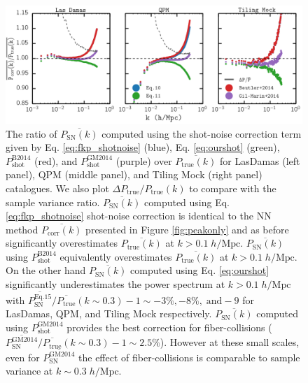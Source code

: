 \documentclass{emulateapj}
\begin{document}
\begin{figure}
\begin{center}
\includegraphics[scale=0.55]{fcpaper_pk_shotnoiseonly_comp.png}
\caption{The ratio of $\overline{P_\mathrm{SN}(k)}$ computed using the shot-noise correction term given by Eq. \ref{eq:fkp_shotnoise} (blue), Eq. \ref{eq:ourshot} (green), $P^\mathrm{B2014}_\mathrm{shot}$ (red), and $P^{\mathrm{GM2014}}_\mathrm{shot}$ (purple) over $\overline{P_\mathrm{true}(k)}$ for LasDamas (left panel), QPM (middle panel), and Tiling Mock (right panel) catalogues. We also plot $\Delta P_\mathrm{true}/P_\mathrm{true}(k)$ to compare with the sample variance ratio. $\overline{P_\mathrm{SN}(k)}$ computed using Eq. \ref{eq:fkp_shotnoise} shot-noise correction is identical to the NN method $\overline{P_\mathrm{corr}(k)}$ presented in Figure \ref{fig:peakonly} and as before significantly overestimates $\overline{P_\mathrm{true}(k)}$ at $k > 0.1 \; h/\mathrm{Mpc}$. $\overline{P_\mathrm{SN}(k)}$ using $P^\mathrm{B2014}_\mathrm{shot}$ equivalently overestimates $\overline{P_\mathrm{true}(k)}$ at $k > 0.1 \; h/\mathrm{Mpc}$. On the other hand $\overline{P_\mathrm{SN}(k)}$ computed using Eq. \ref{eq:ourshot} significantly underestimates the power spectrum at $k > 0.1 \; h/\mathrm{Mpc}$ with $\overline{P^\mathrm{Eq.15}_\mathrm{SN}}/\overline{P_\mathrm{true}}(k \sim 0.3) -1 \sim -3 \%, -8 \%, \;\mathrm{and} -9$ for LasDamas, QPM, and Tiling Mock respectively. $\overline{P_\mathrm{SN}(k)}$ computed using $P^\mathrm{GM2014}_\mathrm{shot}$ provides the best correction for fiber-collisions ($\overline{P^\mathrm{GM2014}_\mathrm{SN}}/\overline{P_\mathrm{true}}(k \sim 0.3) -1 \sim 2.5 \%$). However at these small scales, even for $\overline{P^\mathrm{GM2014}_\mathrm{SN}}$ the effect of fiber-collisions is comparable to sample variance at $k \sim 0.3 \;h/\mathrm{Mpc}$. } \label{fig:shotnoise}
\end{center}
\end{figure}
\end{document}
